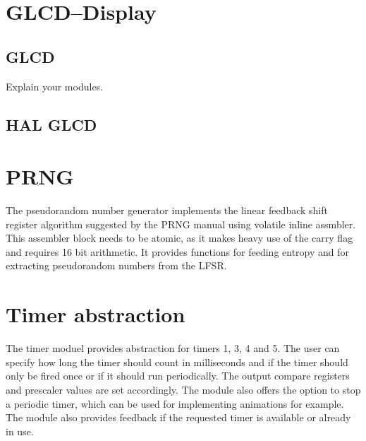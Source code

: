 \documentclass[12pt,a4paper,titlepage,oneside]{article}
\begin{document}
\section{GLCD--Display}

\subsection{GLCD}

Explain your modules.

\subsection{HAL GLCD}

\section{PRNG}

The pseudorandom number generator implements the linear feedback shift register
algorithm suggested by the PRNG manual using volatile inline assmbler. This
assembler block needs to be atomic, as it makes heavy use of the carry flag 
and requires 16 bit arithmetic. It provides functions for feeding entropy and 
for extracting pseudorandom numbers from the LFSR.

\section{Timer abstraction}

The timer moduel provides abstraction for timers 1, 3, 4 and 5. The user can
specify how long the timer should count in milliseconds and if the timer should
only be fired once or if it should run periodically. The output compare registers
and prescaler values are set accordingly. The module also offers the option to
stop a periodic timer, which can be used for implementing animations for 
example. The module also provides feedback if the requested timer is available
or already in use.
\end{document}

